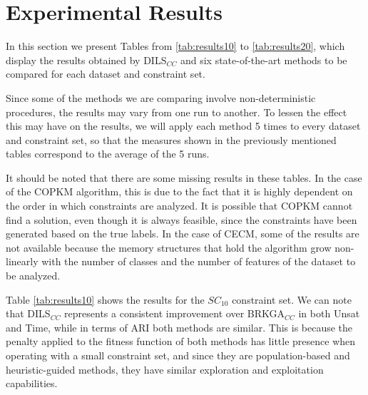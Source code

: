 \documentclass[review]{elsarticle}
\begin{document}
\section{Experimental Results} \label{sec:results}

In this section we present Tables from \ref{tab:results10} to \ref{tab:results20}, which display the results obtained by DILS$_{CC}$ and six state-of-the-art methods to be compared for each dataset and constraint set.

Since some of the methods we are comparing involve non-deterministic procedures, the results may vary from one run to another. To lessen the effect this may have on the results, we will apply each method 5 times to every dataset and constraint set, so that the measures shown in the previously mentioned tables correspond to the average of the 5 runs.

It should be noted that there are some missing results in these tables. In the case of the COPKM algorithm, this is due to the fact that it is highly dependent on the order in which constraints are analyzed. It is possible that COPKM cannot find a solution, even though it is always feasible, since the constraints have been generated based on the true labels. In the case of CECM, some of the results are not available because the memory structures that hold the algorithm grow non-linearly with the number of classes and the number of features of the dataset to be analyzed.

Table \ref{tab:results10} shows the results for the $SC_{10}$ constraint set. We can note that DILS$_{CC}$ represents a consistent improvement over BRKGA$_{CC}$ in both Unsat and Time, while in terms of ARI both methods are similar. This is because the penalty applied to the fitness function of both methods has little presence when operating with a small constraint set, and since they are population-based and heuristic-guided methods, they have similar exploration and exploitation capabilities.
	
\end{document}

